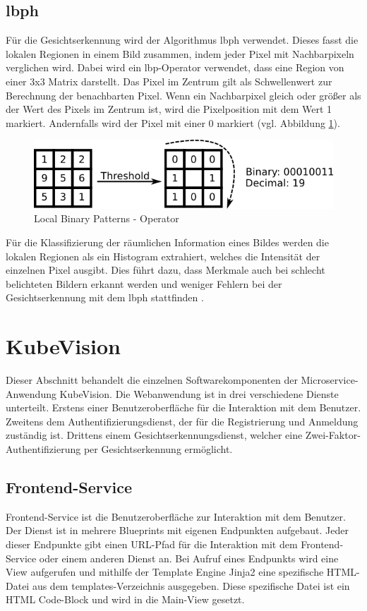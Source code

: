 \subsection{ \ac*{lbph} }
Für die Gesichtserkennung wird der Algorithmus \acs{lbph} verwendet.
Dieses fasst die lokalen Regionen in einem Bild zusammen, indem jeder Pixel mit Nachbarpixeln verglichen wird.
Dabei wird ein \ac{lbp}-Operator verwendet, dass eine Region von einer 3x3 Matrix darstellt.
Das Pixel im Zentrum gilt als Schwellenwert zur Berechnung der benachbarten Pixel.
Wenn ein Nachbarpixel gleich oder größer als der Wert des Pixels im Zentrum ist, wird die Pixelposition mit dem Wert 1 markiert.
Andernfalls wird der Pixel mit einer 0 markiert \cite{opencvlbp} (vgl. Abbildung \ref{fig:lbp}).

\begin{figure}[!htb]
  \centering
  \includegraphics[width=1.0\columnwidth]{images/lbp.png}
  \caption{Local Binary Patterns - Operator \cite{opencvlbp}}
  \label{fig:lbp}
\end{figure}

Für die Klassifizierung der räumlichen Information eines Bildes werden die lokalen Regionen als ein Histogram extrahiert, welches die Intensität der einzelnen Pixel ausgibt.
Dies führt dazu, dass Merkmale auch bei schlecht belichteten Bildern erkannt werden und weniger Fehlern bei der Gesichtserkennung mit dem \acs{lbph} stattfinden \cite{realtimefacerecog}.


\section{KubeVision}
Dieser Abschnitt behandelt die einzelnen Softwarekomponenten der Microservice-Anwendung KubeVision.
Die Webanwendung ist in drei verschiedene Dienste unterteilt.
Erstens einer Benutzeroberfläche für die Interaktion mit dem Benutzer.
Zweitens dem Authentifizierungsdienst, der für die Registrierung und Anmeldung zuständig ist.
Drittens einem Gesichtserkennungsdienst, welcher eine Zwei-Faktor-Authentifizierung per Gesichtserkennung ermöglicht.

\subsection{Frontend-Service}
Frontend-Service ist die Benutzeroberfläche zur Interaktion mit dem Benutzer.
Der Dienst ist in mehrere Blueprints mit eigenen Endpunkten aufgebaut.
Jeder dieser Endpunkte gibt einen URL-Pfad für die Interaktion mit dem Frontend-Service oder einem anderen Dienst an.
Bei Aufruf eines Endpunkts wird eine View aufgerufen und mithilfe der Template Engine Jinja2 eine spezifische HTML-Datei aus dem templates-Verzeichnis ausgegeben.
Diese spezifische Datei ist ein HTML Code-Block und wird in die Main-View gesetzt.

